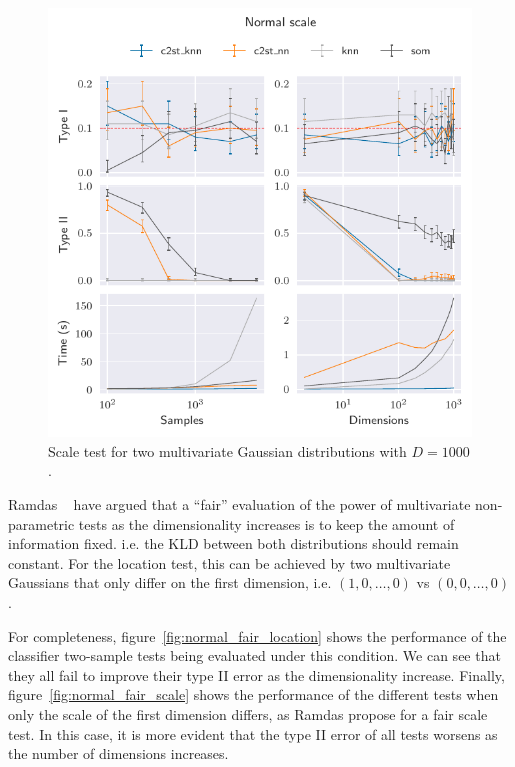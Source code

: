 \begin{figure}[htbp]
    \centering
    \includegraphics{images/6_som/normal_scale}
    \caption[Scale test for two multivariate Gaussian distributions.]{
    Scale test for two multivariate Gaussian distributions with $D=1000$.}
    \label{fig:normal_scale}
\end{figure}

Ramdas \etal~\cite{ramdas2015decreasing} have argued that a ``fair'' evaluation of the
power of multivariate non-parametric tests as the dimensionality increases is to keep the
amount of information fixed. i.e. the \gls{KLD} between both distributions
should remain constant.
For the location test, this can be achieved by two multivariate Gaussians that only differ
on the first dimension, i.e. $(1, 0, \ldots, 0)$ vs $(0, 0, \ldots, 0)$.

For completeness, figure~\ref{fig:normal_fair_location} shows the performance of the classifier
two-sample tests being evaluated under this condition. We can see that they all fail to improve
their type II error as the dimensionality increase.
Finally, figure~\ref{fig:normal_fair_scale} shows the performance of the different
tests when only the scale of the first dimension differs, as Ramdas \etal propose
for a fair scale test. In this case, it is more evident that the type II error of all
tests worsens as the number of dimensions increases.

